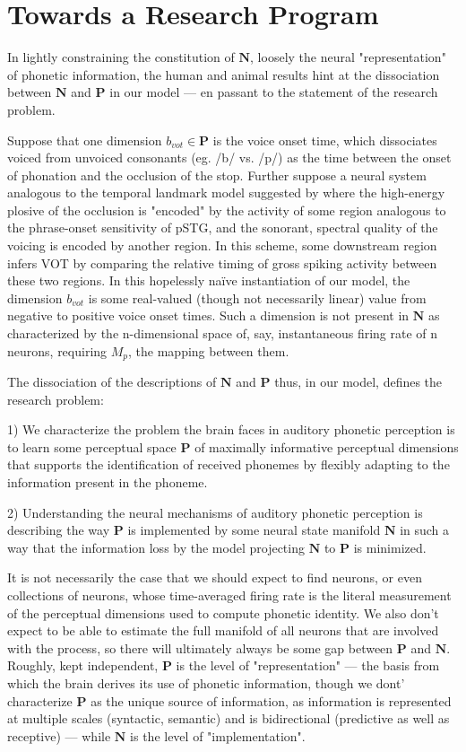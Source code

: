 \section{Towards a Research Program}

In lightly constraining the constitution of $\mathbf{N}$, loosely the neural "representation" of phonetic information, the human and animal results hint at the dissociation between $\mathbf{N}$ and $\mathbf{P}$ in our model --- en passant to the statement of the research problem. 

Suppose that one dimension $b_{vot} \in \mathbf{P}$ is the voice onset time, which dissociates voiced from unvoiced consonants (eg. /b/ vs. /p/) as the time between the onset of phonation and the occlusion of the stop. Further suppose a neural system analogous to the temporal landmark model suggested by \citep{hamiltonSpatialMapOnset2018a} where the high-energy plosive of the occlusion is "encoded" by the activity of some region analogous to the phrase-onset sensitivity of pSTG, and the sonorant, spectral quality of the voicing is encoded by another region. In this scheme, some downstream region infers VOT by comparing the relative timing of gross spiking activity between these two regions. In this hopelessly na\"ive instantiation of our model, the dimension $b_{vot}$ is some real-valued (though not necessarily linear) value from negative to positive voice onset times. Such a dimension is not present in $\mathbf{N}$ as characterized by the n-dimensional space of, say, instantaneous firing rate of n neurons, requiring $M_p$, the mapping between them. 

The dissociation of the descriptions of $\mathbf{N}$ and $\mathbf{P}$ thus, in our model, defines the research problem: 

1) We characterize the problem the brain faces in auditory phonetic perception is to learn some perceptual space $\mathbf{P}$ of maximally informative perceptual dimensions that supports the identification of received phonemes by flexibly adapting to the information present in the phoneme. 

2) Understanding the neural mechanisms of auditory phonetic perception is describing the way $\mathbf{P}$ is implemented by some neural state manifold $\mathbf{N}$ in such a way that the information loss by the model projecting $\mathbf{N}$ to $\mathbf{P}$ is minimized. 

It is not necessarily the case that we should expect to find neurons, or even collections of neurons, whose time-averaged firing rate is the literal measurement of the perceptual dimensions used to compute phonetic identity. We also don't expect to be able to estimate the full manifold of all neurons that are involved with the process, so there will ultimately always be some gap between $\mathbf{P}$ and $\mathbf{N}$. Roughly, kept independent, $\mathbf{P}$ is the level of "representation" --- the basis from which the brain derives its use of phonetic information, though we dont' characterize $\mathbf{P}$ as the unique source of information, as information is represented at multiple scales (syntactic, semantic) and is bidirectional (predictive as well as receptive) --- while $\mathbf{N}$ is the level of "implementation".

